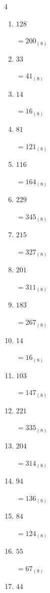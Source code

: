 \begin{multicols}{4}
\begin{enumerate}
  \item $128$

        $=200_{(8)}$

  \item $33$

        $=41_{(8)}$

  \item $14$

        $=16_{(8)}$

  \item $81$

        $=121_{(8)}$

  \item $116$

        $=164_{(8)}$

  \item $229$

        $=345_{(8)}$

  \item $215$

        $=327_{(8)}$

\columnbreak %

  \item $201$

        $=311_{(8)}$

  \item $183$

        $=267_{(8)}$

  \item $14$

        $=16_{(8)}$

  \item $103$

        $=147_{(8)}$

  \item $221$

        $=335_{(8)}$

  \item $204$

        $=314_{(8)}$

  \item $94$

        $=136_{(8)}$

  \item $84$

        $=124_{(8)}$

  \item $55$

        $=67_{(8)}$

  \item $44$


\end{enumerate}
\end{multicols}
